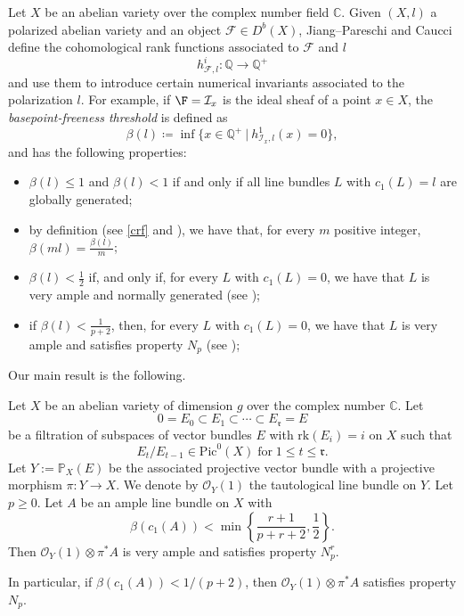 \documentclass[11pt,letter]{amsart}
\numberwithin{equation}{section}
\begin{document}
Let $X$ be an abelian variety over the complex number field $\mathbb{C}$. 
Given $(X,l)$ a polarized abelian variety and an object $\mathcal{F}\in D^b(X)$, Jiang--Pareschi \cite{JiPa2020} and Caucci \cite{Caucci} define the {cohomological rank functions} associated to $\mathcal{F}$ and $l$
\[
h^i_{\mathcal{F},l}:\mathbb{Q}\rightarrow\mathbb{Q}^+
\]
and use them to introduce certain numerical invariants associated to the polarization $l$. For example, if $\mathcal{\F}=\mathcal{I}_x$ is the ideal sheaf of a point $x\in X$, the \emph{basepoint-freeness threshold} is defined as
\[\beta(l)\coloneq\inf\{x\in\mathbb{{Q}}^+\:|\:h^1_{\mathcal{I}_x,l}(x)=0\},\] 
and has the following properties:
\begin{itemize}
    \item $\beta(l)\leq 1$ and $\beta(l)<1$ if and only if all line bundles $L$ with $c_1(L)=l$ are globally generated;
    \item by definition (see \ref{crf} and \cite[Proof of Cor. 1.2]{Caucci}), we have that, for every $m$ positive integer, $\beta(ml)=\frac{\beta(l)}{m}$;
    \item $\beta(l)<\frac{1}{2}$ if, and only if, for every $L$ with $c_1(L)=0$, we have that $L$ is very ample and normally generated (see \cite[Cor. E]{JiPa2020});
    \item if $\beta(l)<\frac{1}{p+2}$, then, for every $L$ with $c_1(L)=0$, we have that $L$ is very ample and satisfies property $N_p$ (see \cite[Thm. 1.1]{Caucci});
\end{itemize}
 Our main result is the following.
\begin{introthm}\label{TheoremA}%
Let $X$ be an abelian variety of dimension $g$ over the complex number $\mathbb{C}$. Let 
\[
0=E_0\subset E_1\subset \cdots \subset E_\mathfrak{r}=E
\]
be a filtration of subspaces of vector bundles $E$ with $\mathrm{rk}(E_i)=i$ on $X$ such that
\[
E_t/E_{t-1}\in\mathrm{Pic}^0(X)\;\text{for}\;1\leq t\leq\mathfrak{r}.
\] 
Let $Y:=\mathbb{P}_X(E)$ be the associated projective vector bundle with a projective morphism $\pi:Y\rightarrow X$. We denote by $\mathcal{O}_Y(1)$ the tautological line bundle on $Y$. Let $p\geq 0$. Let $A$ be an ample line bundle on $X$ with 
\[\beta(c_1(A))<\min\left\{\frac{r+1}{p+r+2},\frac{1}{2}\right\}.\] Then $\mathcal{O}_Y(1)\otimes\pi^* A$ is very ample and satisfies property $N_p^r$.

In particular, if $\beta(c_1(A))<1/(p+2)$, then $\mathcal{O}_Y(1)\otimes\pi^* A$ satisfies property $N_p$.

\end{introthm}
\end{document}

